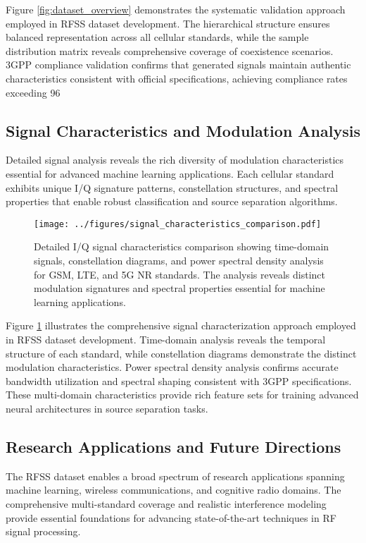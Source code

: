 \documentclass[twocolumn]{article}
\begin{document}
Figure \ref{fig:dataset_overview} demonstrates the systematic validation approach employed in RFSS dataset development. The hierarchical structure ensures balanced representation across all cellular standards, while the sample distribution matrix reveals comprehensive coverage of coexistence scenarios. 3GPP compliance validation confirms that generated signals maintain authentic characteristics consistent with official specifications, achieving compliance rates exceeding 96%

\subsection{Signal Characteristics and Modulation Analysis}

Detailed signal analysis reveals the rich diversity of modulation characteristics essential for advanced machine learning applications. Each cellular standard exhibits unique I/Q signature patterns, constellation structures, and spectral properties that enable robust classification and source separation algorithms.

\begin{figure}[h]
\centering
\texttt{[image: ../figures/signal\_characteristics\_comparison.pdf]}
\caption{Detailed I/Q signal characteristics comparison showing time-domain signals, constellation diagrams, and power spectral density analysis for GSM, LTE, and 5G NR standards. The analysis reveals distinct modulation signatures and spectral properties essential for machine learning applications.}
\label{fig:signal_comparison}
\end{figure}

Figure \ref{fig:signal_comparison} illustrates the comprehensive signal characterization approach employed in RFSS dataset development. Time-domain analysis reveals the temporal structure of each standard, while constellation diagrams demonstrate the distinct modulation characteristics. Power spectral density analysis confirms accurate bandwidth utilization and spectral shaping consistent with 3GPP specifications. These multi-domain characteristics provide rich feature sets for training advanced neural architectures in source separation tasks.

\subsection{Research Applications and Future Directions}

The RFSS dataset enables a broad spectrum of research applications spanning machine learning, wireless communications, and cognitive radio domains. The comprehensive multi-standard coverage and realistic interference modeling provide essential foundations for advancing state-of-the-art techniques in RF signal processing.
\end{document}
